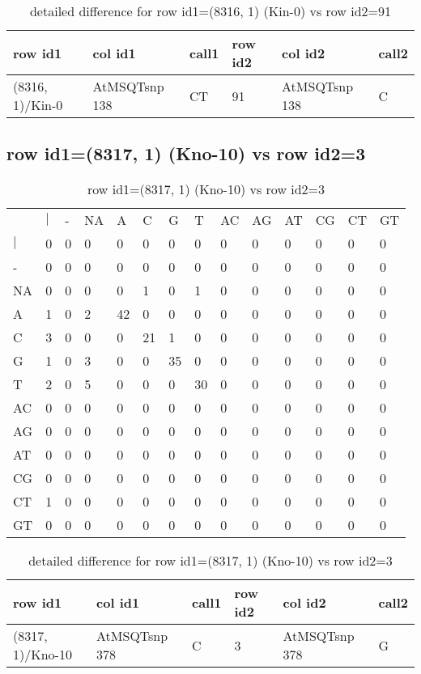 \begin{center}
\begin{longtable}{|l|l|l|l|l|l|}
\caption{detailed difference for row id1=(8316, 1) (Kin-0) vs row id2=91} \label{table_dm305}\\
\hline
row id1&col id1&call1&row id2&col id2&call2\\
\hline
(8316, 1)/Kin-0&AtMSQTsnp 138&CT&91&AtMSQTsnp 138&C\\
\hline
\end{longtable}
\end{center}

\subsection{row id1=(8317, 1) (Kno-10) vs row id2=3}
\begin{center}
\begin{longtable}{|l|l|l|l|l|l|l|l|l|l|l|l|l|l|}
\caption{row id1=(8317, 1) (Kno-10) vs row id2=3} \label{table_dm306}\\
\hline
\\
\hline
&$|$&-&NA&A&C&G&T&AC&AG&AT&CG&CT&GT\\
$|$&0&0&0&0&0&0&0&0&0&0&0&0&0\\
-&0&0&0&0&0&0&0&0&0&0&0&0&0\\
NA&0&0&0&0&1&0&1&0&0&0&0&0&0\\
A&1&0&2&42&0&0&0&0&0&0&0&0&0\\
C&3&0&0&0&21&1&0&0&0&0&0&0&0\\
G&1&0&3&0&0&35&0&0&0&0&0&0&0\\
T&2&0&5&0&0&0&30&0&0&0&0&0&0\\
AC&0&0&0&0&0&0&0&0&0&0&0&0&0\\
AG&0&0&0&0&0&0&0&0&0&0&0&0&0\\
AT&0&0&0&0&0&0&0&0&0&0&0&0&0\\
CG&0&0&0&0&0&0&0&0&0&0&0&0&0\\
CT&1&0&0&0&0&0&0&0&0&0&0&0&0\\
GT&0&0&0&0&0&0&0&0&0&0&0&0&0\\
\hline
\end{longtable}
\end{center}

\begin{center}
\begin{longtable}{|l|l|l|l|l|l|}
\caption{detailed difference for row id1=(8317, 1) (Kno-10) vs row id2=3} \label{table_dm307}\\
\hline
row id1&col id1&call1&row id2&col id2&call2\\
\hline
(8317, 1)/Kno-10&AtMSQTsnp 378&C&3&AtMSQTsnp 378&G\\
\hline
\end{longtable}
\end{center}


